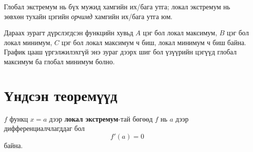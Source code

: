 \begin{remark}
Глобал экстремум нь бүх мужид хамгийн их/бага утга; локал экстремум нь зөвхөн тухайн цэгийн \emph{орчимд} хамгийн их/бага утга юм.
\end{remark}
\begin{example}
Дараах зурагт дүрслэгдсэн функцийн хувьд $A$ цэг бол локал максимум, $B$ цэг бол локал минимум, $C$ цэг бол локал максимум ч биш, локал минимум ч биш байна. График цааш үргэлжилэхгүй энэ зураг дээрх шиг бол үзүүрийн цэгүүд глобал максимум ба глобал минимум болно. 
\begin{center}
\end{center}
\end{example}

\section{Үндсэн теоремүүд}
\begin{theorem}[Ферма]
$f$ функц $x=a$ дээр \textbf{локал экстремум}-тай бөгөөд $f$ нь $a$ дээр дифференциалчлагддаг бол
\[
f'(a)=0
\] байна.
\end{theorem}

